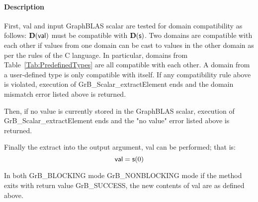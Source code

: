\paragraph{Description}

First, {\sf val} and input GraphBLAS scalar are tested for domain compatibility as follows:
$\mathbf{D}({\sf val})$ must be compatible with $\mathbf{D}({\sf s})$. Two domains 
are compatible with each other if values from one domain can be cast to values 
in the other domain as per the rules of the C language. In particular, domains 
from Table~\ref{Tab:PredefinedTypes} are all compatible with each other. A domain 
from a user-defined type is only compatible with itself. If any compatibility 
rule above is violated, execution of {\sf GrB\_Scalar\_extractElement} ends and 
the domain mismatch error listed above is returned.

Then, if no value is currently stored in the GraphBLAS scalar, execution of 
{\sf GrB\_Scalar\_extractElement} ends and the "no value" error listed above is returned.

Finally the extract into the output argument, {\sf val} can be performed;  
that is:
\[
    {\sf val} = {\sf s}(0)
\]

In both {\sf GrB\_BLOCKING} mode {\sf GrB\_NONBLOCKING} mode
if the method exits with return value {\sf GrB\_SUCCESS}, the  new 
contents of {\sf val} are as defined above.  

